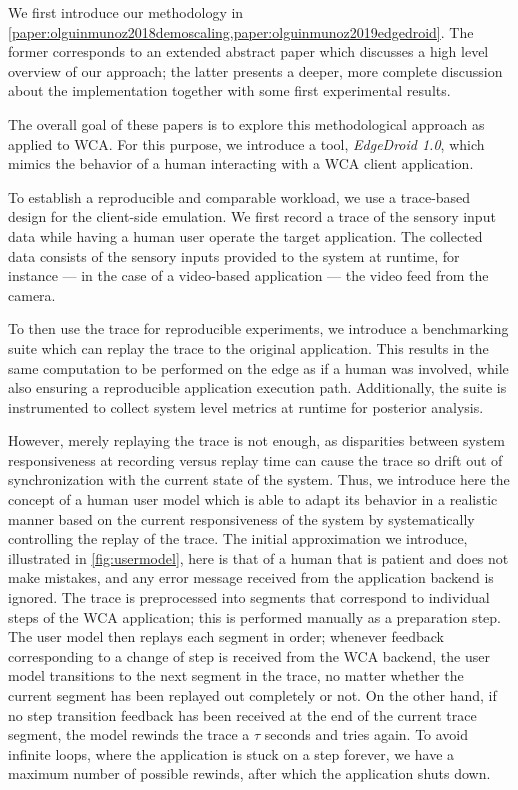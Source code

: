 We first introduce our methodology in \cref{paper:olguinmunoz2018demoscaling,paper:olguinmunoz2019edgedroid}.
The former corresponds to an extended abstract paper which discusses a high level overview of our approach; the latter presents a deeper, more complete discussion about the implementation together with some first experimental results.

The overall goal of these papers is to explore this methodological approach as applied to \ac{WCA}.
For this purpose, we introduce a tool, \emph{EdgeDroid 1.0}, which mimics the behavior of a human interacting with a \ac{WCA} client application.




To establish a reproducible and comparable workload, we use a trace-based design for the client-side emulation.
We first record a trace of the sensory input data while having a human user operate the target application.
The collected data consists of the sensory inputs provided to the system at runtime, for instance --- in the case of a video-based application --- the video feed from the camera.

To then use the trace for reproducible experiments, we introduce a benchmarking suite which can replay the trace to the original application.
This results in the same computation to be performed on the edge as if a human was involved, while also ensuring a reproducible application execution path.
Additionally, the suite is instrumented to collect system level metrics at runtime for posterior analysis.

However, merely replaying the trace is not enough, as disparities between system responsiveness at recording versus replay time can cause the trace so drift out of synchronization with the current state of the system.
Thus, we introduce here the concept of a human user model which is able to adapt its behavior in a realistic manner based on the current responsiveness of the system by systematically controlling the replay of the trace.
The initial approximation we introduce, illustrated in \cref{fig:usermodel}, here is that of a human that is patient and does not make mistakes, and any error message received from the application backend is ignored.
The trace is preprocessed into segments that correspond to individual steps of the \ac{WCA} application; this is performed manually as a preparation step.
The user model then replays each segment in order; whenever feedback corresponding to a change of step is received from the \ac{WCA} backend, the user model transitions to the next segment in the trace, no matter whether the current segment has been replayed out completely or not.
On the other hand, if no step transition feedback has been received at the end of the current trace segment, the model rewinds the trace a $\tau$ seconds and tries again.
To avoid infinite loops, where the application is stuck on a step forever, we have a maximum number of possible rewinds, after which the application shuts down.

